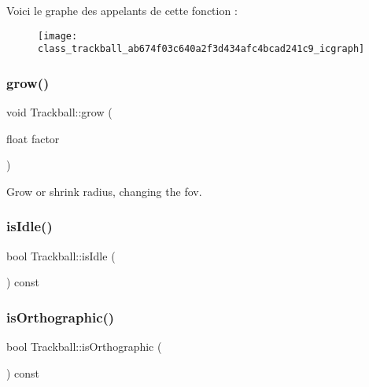 Voici le graphe des appelants de cette fonction \+:\nopagebreak
\begin{figure}[H]
\begin{center}
\leavevmode
\texttt{[image: class\_trackball\_ab674f03c640a2f3d434afc4bcad241c9\_icgraph]}
\end{center}
\end{figure}
\mbox{\label{class_trackball_a4ac38af7646e5998ac341051d0458c58}} 
\subsubsection{\texorpdfstring{grow()}{grow()}}
{\footnotesize\ttfamily void Trackball\+::grow (\begin{DoxyParamCaption}\item[{float}]{factor }\end{DoxyParamCaption})}



Grow or shrink radius, changing the fov. 

\mbox{\label{class_trackball_a29102c33e22690b2ad3990c516800220}} 
\subsubsection{\texorpdfstring{is\+Idle()}{isIdle()}}
{\footnotesize\ttfamily bool Trackball\+::is\+Idle (\begin{DoxyParamCaption}{ }\end{DoxyParamCaption}) const}

\mbox{\label{class_trackball_a3712c12a5a5468301593a01b0df4c6be}} 
\subsubsection{\texorpdfstring{is\+Orthographic()}{isOrthographic()}}
{\footnotesize\ttfamily bool Trackball\+::is\+Orthographic (\begin{DoxyParamCaption}{ }\end{DoxyParamCaption}) const}

